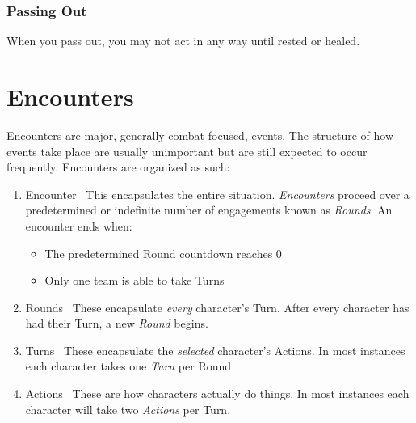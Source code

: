 \subsection{Passing Out}\label{subsec:pass_out}
When you pass out, you may not act in any way until rested or healed.

\chapter{Encounters}\label{ch:encounter}
Encounters are major, generally combat focused, events. The structure of how events take place are usually unimportant but are still expected to occur frequently. Encounters are organized as such:
\begin{enumerate}
	\item {\large Encounter} \linebreak\
	This encapsulates the entire situation. \emph{Encounters} proceed over a predetermined or indefinite number of engagements known as \emph{Rounds}. An encounter ends when: 
	\begin{itemize}
		\item The predetermined Round countdown reaches 0
		\item Only one team is able to take Turns
	\end{itemize}
\item {\large Rounds} \linebreak\
	These encapsulate \emph{every} character's Turn. After every character has had their Turn, a new \emph{Round} begins.
\item {\large Turns}\index{Turn} \linebreak\
	These encapsulate the \emph{selected} character's Actions. In most instances each character takes one \emph{Turn} per Round
\item {\large Actions}\index{Action} \linebreak\
	These are how characters actually do things. In most instances each character will take two \emph{Actions} per Turn.
\end{enumerate}

